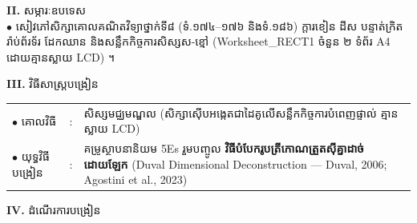 \documentclass[a4paper,10pt]{article}
\newcommand{\en}[1]{{\TimesEn #1}}
\begin{document}
{\vspace{1pt}

\textbf{II.} {\muol សម្ភារៈឧបទេស}\\[1pt]
\hspace*{0.55cm}$\bullet$ \hspace{0.35cm} សៀវភៅសិក្សាគោលគណិតវិទ្យាថ្នាក់ទី៨ (ទំ.១៧៤--១៧៦ និងទំ.១៨៦) ក្ដារខៀន ដីស បន្ទាត់ក្រិត រ៉ាប់ព័រទ័រ ដែកឈាន និងសន្លឹកកិច្ចការសិស្សស-ខ្មៅ (\en{Worksheet\_RECT1} ចំនួន ២ ទំព័រ \en{A4} ដោយគ្មានស្លាយ \en{LCD}) ។

\vspace{1pt}

\textbf{III.} {\muol វិធីសាស្រ្តបង្រៀន}\\[1pt]
\hspace*{0.45cm}%
\begin{tabular}{@{}l l L{14.85cm}@{}}
  $\bullet$ \hspace{0.25cm} គោលវិធី & : & សិស្សមជ្ឈមណ្ឌល (សិក្សាស៊ើបអង្កេតជាដៃគូលើសន្លឹកកិច្ចការបំពេញផ្ទាល់ គ្មានស្លាយ \en{LCD}) \\
  $\bullet$ \hspace{0.25cm} យុទ្ធវិធីបង្រៀន & : & គម្រូស្ថាបនានិយម \en{5Es} រួមបញ្ចូល \textbf{វិធីបំបែករូបត្រីកោណត្រួតស៊ីគ្នាដាច់ដោយឡែក} (\en{Duval Dimensional Deconstruction — Duval, 2006; Agostini et al., 2023}) \\
\end{tabular}
}

\vspace{1pt}

\textbf{IV.} {\muol ដំណើរការបង្រៀន}

\vspace{1pt}
\end{document}
